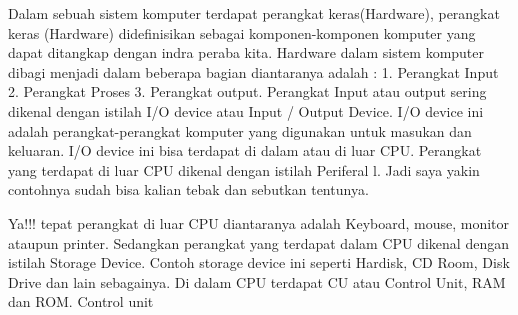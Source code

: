 Dalam sebuah sistem komputer terdapat perangkat keras(Hardware), perangkat keras (Hardware) didefinisikan sebagai komponen-komponen komputer yang dapat ditangkap dengan indra peraba kita. Hardware dalam sistem komputer dibagi menjadi dalam beberapa bagian diantaranya adalah : 1. Perangkat Input 2. Perangkat Proses 3. Perangkat output. Perangkat Input atau output sering dikenal dengan istilah I/O device atau Input / Output Device. I/O device ini adalah perangkat-perangkat komputer yang digunakan untuk masukan dan keluaran. I/O device ini bisa terdapat di dalam atau di luar CPU. Perangkat yang terdapat di luar CPU dikenal dengan istilah Periferal l. Jadi saya yakin contohnya sudah bisa kalian tebak dan sebutkan tentunya.

Ya!!! tepat perangkat di luar CPU diantaranya adalah Keyboard, mouse, monitor ataupun printer. Sedangkan perangkat yang terdapat dalam CPU dikenal dengan istilah Storage Device. Contoh storage device ini seperti Hardisk, CD Room, Disk Drive dan lain sebagainya. Di dalam CPU terdapat CU atau Control Unit, RAM dan ROM. Control unit